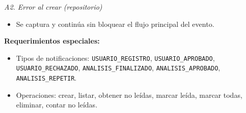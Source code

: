 \vspace{0.3em}
\noindent\textit{A2. Error al crear (repositorio)}
\begin{itemize}[nosep]
    \item Se captura y continúa sin bloquear el flujo principal del evento.
\end{itemize}

\vspace{0.5em}
\noindent\textbf{Requerimientos especiales:}
\begin{itemize}[nosep]
    \item Tipos de notificaciones: \texttt{USUARIO\_REGISTRO}, \texttt{USUARIO\_APROBADO}, \texttt{USUARIO\_RECHAZADO}, \texttt{ANALISIS\_FINALIZADO}, \texttt{ANALISIS\_APROBADO}, \texttt{ANALISIS\_REPETIR}.
    \item Operaciones: crear, listar, obtener no leídas, marcar leída, marcar todas, eliminar, contar no leídas.
\end{itemize}
